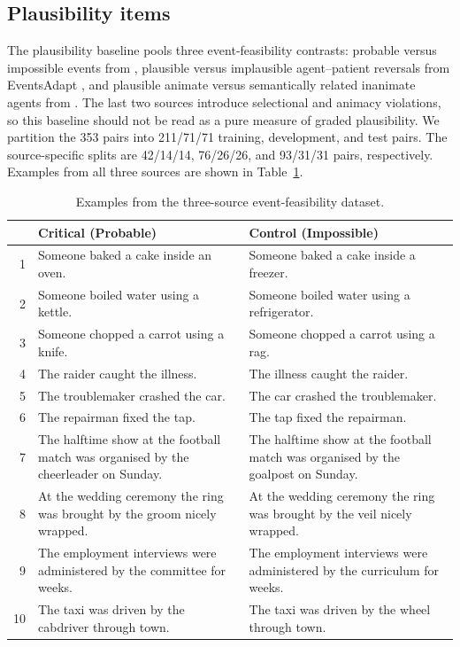 \subsection{Plausibility items}
\label{app:plausibility-examples}

The plausibility baseline pools three event-feasibility contrasts: probable
versus impossible events from \citet{hu-etal-2025-shades}, plausible versus
implausible agent--patient reversals from EventsAdapt
\citep{kauf-etal-2023-event}, and plausible animate versus semantically related
inanimate agents from \citet{vega-mendoza-etal-2021-concurrent}. The last two
sources introduce selectional and animacy violations, so this baseline should
not be read as a pure measure of graded plausibility. We partition the 353
pairs into 211/71/71 training, development, and test pairs. The source-specific
splits are 42/14/14, 76/26/26, and 93/31/31 pairs, respectively. Examples from
all three sources are shown in Table~\ref{tab:plausibility-examples}.

\begin{table}[htbp]
\centering
\footnotesize
\setlength{\tabcolsep}{4pt}
\renewcommand{\arraystretch}{1.08}
\caption{Examples from the three-source event-feasibility dataset.}
\label{tab:plausibility-examples}
\begin{tabular}{@{}r p{} p{}@{}}
\toprule
& Critical (Probable) & Control (Impossible) \\
\midrule
1 & Someone baked a cake inside an oven. & Someone baked a cake inside a freezer. \\
2 & Someone boiled water using a kettle. & Someone boiled water using a refrigerator. \\
3 & Someone chopped a carrot using a knife. & Someone chopped a carrot using a rag. \\
4 & The raider caught the illness. & The illness caught the raider. \\
5 & The troublemaker crashed the car. & The car crashed the troublemaker. \\
6 & The repairman fixed the tap. & The tap fixed the repairman. \\
7 & The halftime show at the football match was organised by the cheerleader on Sunday. & The halftime show at the football match was organised by the goalpost on Sunday. \\
8 & At the wedding ceremony the ring was brought by the groom nicely wrapped. & At the wedding ceremony the ring was brought by the veil nicely wrapped. \\
9 & The employment interviews were administered by the committee for weeks. & The employment interviews were administered by the curriculum for weeks. \\
10 & The taxi was driven by the cabdriver through town. & The taxi was driven by the wheel through town. \\
\bottomrule
\end{tabular}
\end{table}
